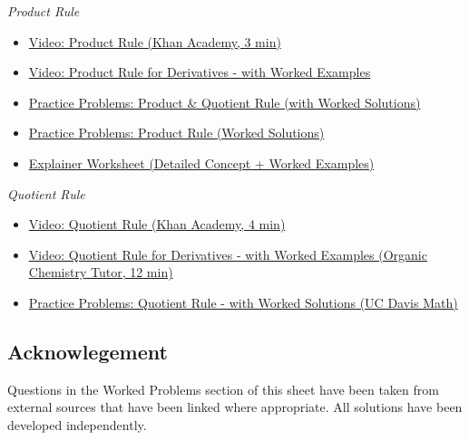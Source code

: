 \documentclass{article}
\begin{document}
\noindent \newline
\textit{Product Rule}
\begin{itemize}
    \item \href{https://www.khanacademy.org/math/ap-calculus-ab/ab-differentiation-1-new/ab-2-8/v/applying-the-product-rule-for-derivatives}{Video: Product Rule (Khan Academy, 3 min)} 

    \item \href{https://youtu.be/17X5g9QArTc}{Video: Product Rule for Derivatives - with Worked Examples}

    \item \href{https://tutorial.math.lamar.edu/problems/calci/productquotientrule.aspx}{Practice Problems: Product \& Quotient Rule (with Worked Solutions)}

    \item \href{https://cdn.kutasoftware.com/Worksheets/Calc/03%20-%20Product%20Rule.pdf}{Practice Problems: Product Rule (Worked Solutions)}

    \item \href{https://www.mathcentre.ac.uk/resources/uploaded/mc-ty-chain-2009-1.pdf}{Explainer Worksheet (Detailed Concept + Worked Examples)}
\end{itemize}

\noindent
\textit{Quotient Rule}
\begin{itemize}
    \item \href{https://www.khanacademy.org/math/ap-calculus-ab/ab-differentiation-1-new/ab-2-9/v/quotient-rule}{Video: Quotient Rule (Khan Academy, 4 min)}

    \item \href{https://youtu.be/8jVDEcQ0wXk}{Video: Quotient Rule for Derivatives - with Worked Examples (Organic Chemistry Tutor, 12 min)}

    \item \href{https://www.math.ucdavis.edu/~kouba/CalcOneDIRECTORY/quotientruledirectory/QuotientRule.html}{Practice Problems: Quotient Rule - with Worked Solutions (UC Davis Math)}
\end{itemize}

\subsection*{Acknowlegement}
Questions in the Worked Problems section of this sheet have been taken from external sources that have been linked where appropriate. All solutions have been developed independently. 
\end{document}

